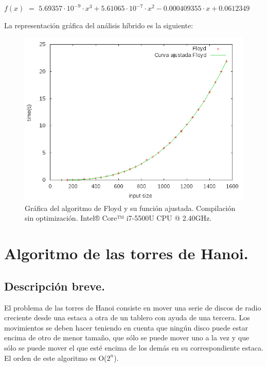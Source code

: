 \documentclass[11pt,a4paper]{article}
\begin{document}
			\par
			$f(x)$ $=$ $ 5.69357\cdot 10^{-9}\cdot x^3 + 5.61065\cdot 10^{-7}\cdot x^2 - 0.000409355\cdot x+ 0.0612349$

\newpage

			\par
			La representación gráfica del análisis híbrido es la siguiente:

			\begin{figure}[h]

				\centering
				\includegraphics[width=1\textwidth]{floyd_ajustado.png}
				\caption{Gráfica del algoritmo de Floyd y su función ajustada. Compilación sin optimización. Intel® Core™ i7-5500U CPU @ 2.40GHz.}

			\end{figure}

\newpage

	\section{Algoritmo de las torres de Hanoi.}

		\subsection{Descripción breve.}

			\par
			El problema de las torres de Hanoi consiste en mover una serie de discos de radio creciente desde una estaca a otra de un tablero con ayuda de una tercera. Los movimientos se deben hacer teniendo en cuenta que ningún disco puede estar encima de otro de menor tamaño, que sólo se puede mover uno a la vez y que sólo se puede mover el que esté encima de los demás en su correspondiente estaca. El orden de este algoritmo es O($2^n$).
\end{document}
